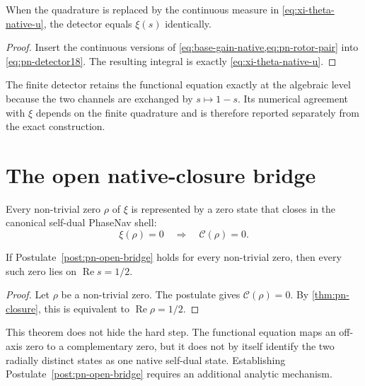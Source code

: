 \begin{proposition}
\label{prop:pn-detector}
When the quadrature is replaced by the continuous measure in
\cref{eq:xi-theta-native-u}, the detector equals $\xi(s)$ identically.
\end{proposition}

\begin{proof}
Insert the continuous versions of \cref{eq:base-gain-native,eq:pn-rotor-pair}
into \cref{eq:pn-detector18}.  The resulting integral is exactly
\cref{eq:xi-theta-native-u}.
\end{proof}

The finite detector retains the functional equation exactly at the algebraic
level because the two channels are exchanged by $s\mapsto1-s$.  Its numerical
agreement with $\xi$ depends on the finite quadrature and is therefore reported
separately from the exact construction.

\section{The open native-closure bridge}

\begin{postulate}
\label{post:pn-open-bridge}
Every non-trivial zero $\rho$ of $\xi$ is represented by a zero state that closes
in the canonical self-dual PhaseNav shell:
\begin{equation}
 \xi(\rho)=0\quad\Longrightarrow\quad\mathcal C(\rho)=0.
 \label{eq:pn-open-bridge}
\end{equation}
\end{postulate}

\begin{theorem}
\label{thm:pn-conditional-rh}
If Postulate~\ref{post:pn-open-bridge} holds for every non-trivial zero, then every such
zero lies on $\operatorname{Re}s=1/2$.
\end{theorem}

\begin{proof}
Let $\rho$ be a non-trivial zero.  The postulate gives
$\mathcal C(\rho)=0$.  By \cref{thm:pn-closure}, this is equivalent to
$\operatorname{Re}\rho=1/2$.
\end{proof}

This theorem does not hide the hard step.  The functional equation maps an
off-axis zero to a complementary zero, but it does not by itself identify the
two radially distinct states as one native self-dual state.  Establishing
Postulate~\ref{post:pn-open-bridge} requires an additional analytic mechanism.

